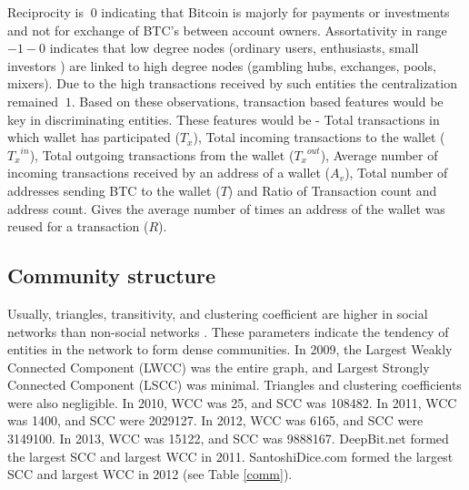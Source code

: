 \documentclass[preprint,12pt]{elsarticle}
\begin{document}
Reciprocity is $~ 0$ indicating that Bitcoin is majorly for payments or investments and not for exchange of BTC's between account owners. Assortativity in range $-1 - 0$ indicates that low degree nodes (ordinary users, enthusiasts, small investors ) are linked to high degree nodes (gambling hubs, exchanges, pools, mixers). Due to the high transactions received by such entities the centralization remained $~1$. Based on these observations, transaction based features would be key in discriminating entities. These features would be - Total transactions in which wallet has participated ($T_x$), Total incoming transactions to the wallet (${T_x}^{in}$), Total outgoing transactions from the wallet (${T_x}^{out}$), Average number of incoming transactions received by an address of a wallet ($A_v$), Total number of addresses sending BTC to the wallet ($T$) and Ratio of Transaction count and address count. Gives the average number of times an address of the wallet was reused for a transaction ($R$).




\subsection{Community structure}
Usually, triangles, transitivity, and clustering coefficient are higher in social networks than non-social networks \cite{lee2019measurements}. These parameters indicate the tendency of entities in the network to form dense communities. In 2009, the Largest Weakly Connected Component (LWCC) was the entire graph, and Largest Strongly Connected Component (LSCC) was minimal. Triangles and clustering coefficients were also negligible. In 2010, WCC was 25, and SCC was 108482. In 2011, WCC was 1400, and SCC were 2029127. In 2012, WCC was 6165, and SCC were 3149100. In 2013, WCC was 15122, and SCC was 9888167. DeepBit.net formed the largest SCC and largest WCC in 2011. SantoshiDice.com formed the largest SCC and largest WCC in 2012 (see Table \ref{comm}).
\end{document}
